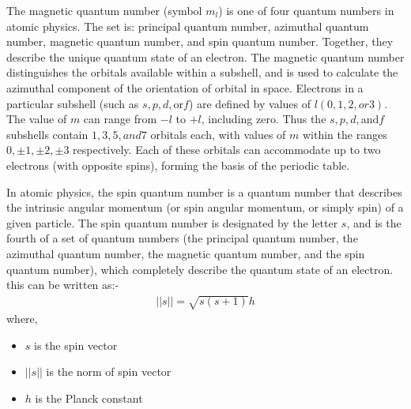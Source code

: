 \begin{chembox}{}
{The magnetic quantum number (symbol $m_l$) is one of four quantum numbers in atomic physics. The set is: principal quantum number, azimuthal quantum number, magnetic quantum number, and spin quantum number. Together, they describe the unique quantum state of an electron. The magnetic quantum number distinguishes the orbitals available within a subshell, and is used to calculate the azimuthal component of the orientation of orbital in space. Electrons in a particular subshell (such as $s, p, d, $or$ f$) are defined by values of $l (0, 1, 2, or 3)$. The value of $m$ can range from $-l$ to $+l$, including zero. Thus the $s, p, d, $and$ f$ subshells contain $1, 3, 5, and 7$ orbitals each, with values of $m$ within the ranges $0, \pm 1, \pm 2, \pm 3$ respectively. Each of these orbitals can accommodate up to two electrons (with opposite spins), forming the basis of the periodic table.}
\end{chembox}
\begin{chembox}{}
{In atomic physics, the spin quantum number is a quantum number that describes the intrinsic angular momentum (or spin angular momentum, or simply spin) of a given particle. The spin quantum number is designated by the letter $s$, and is the fourth of a set of quantum numbers (the principal quantum number, the azimuthal quantum number, the magnetic quantum number, and the spin quantum number), which completely describe the quantum state of an electron.
this can be written as:-
\begin{align*}
 ||s|| = \sqrt{s(s+1)}h
\end{align*}
where, 
\begin{itemize}
    \item {$s$ is the spin vector }
    \item{$||s||$ is the norm of spin vector}
    \item{$h$ is the Planck constant}
\end{itemize}
}
\end{chembox}
